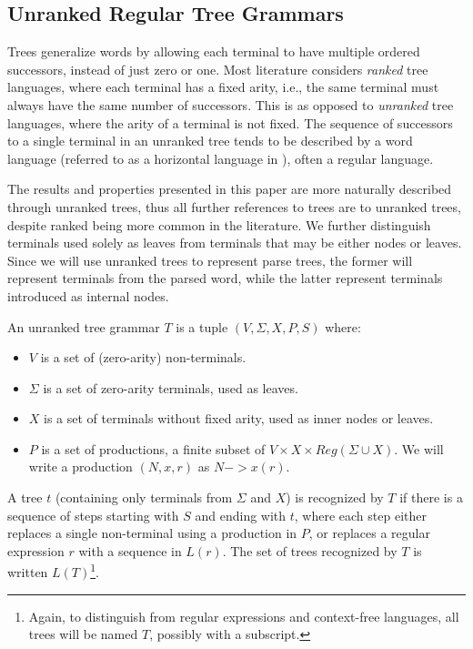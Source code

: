 \documentclass[runningheads]{llncs}
\newcommand{\NT}{V} %
\newcommand{\T}{\Sigma} %
\newcommand{\regex}{\mathit{Reg}}
\begin{document}
\subsection{Unranked Regular Tree Grammars} \label{sec:preliminaries-trees}

Trees generalize words by allowing each terminal to have multiple ordered successors, instead of just zero or one. Most literature considers \emph{ranked} tree languages, where each terminal has a fixed arity, i.e., the same terminal must always have the same number of successors. This is as opposed to \emph{unranked} tree languages, where the arity of a terminal is not fixed. The sequence of successors to a single terminal in an unranked tree tends to be described by a word language (referred to as a horizontal language in \cite{comonTreeAutomataTechniques2007}), often a regular language.

The results and properties presented in this paper are more naturally described through unranked trees, thus all further references to trees are to unranked trees, despite ranked being more common in the literature. We further distinguish terminals used solely as leaves from terminals that may be either nodes or leaves. Since we will use unranked trees to represent parse trees, the former will represent terminals from the parsed word, while the latter represent terminals introduced as internal nodes.

An unranked tree grammar $T$ is a tuple $(\NT, \T, X, P, S)$ where:

\begin{itemize}
\item $\NT$ is a set of (zero-arity) non-terminals.
\item $\T$ is a set of zero-arity terminals, used as leaves.
\item $X$ is a set of terminals without fixed arity, used as inner nodes or leaves.
\item $P$ is a set of productions, a finite subset of $\NT \times X \times \regex(\T \cup X)$. We will write a production $(N, x, r)$ as $N -> x(r)$.
\end{itemize}

\noindent A tree $t$ (containing only terminals from $\T$ and $X$) is recognized by $T$ if there is a sequence of steps starting with $S$ and ending with $t$, where each step either replaces a single non-terminal using a production in $P$, or replaces a regular expression $r$ with a sequence in $L(r)$. The set of trees recognized by $T$ is written $L(T)$\footnote{Again, to distinguish from regular expressions and context-free languages, all trees will be named $T$, possibly with a subscript.}.
\end{document}
